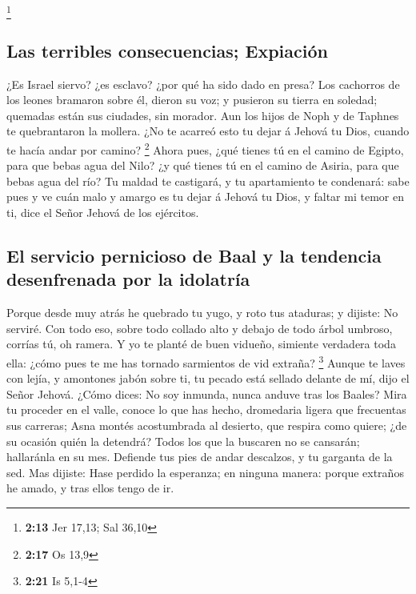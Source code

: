 \footnote{\textbf{2:13} Jer 17,13; Sal 36,10}

\hypertarget{las-terribles-consecuencias-expiaciuxf3n}{%
\subsection{Las terribles consecuencias;
Expiación}\label{las-terribles-consecuencias-expiaciuxf3n}}

 ¿Es Israel siervo? ¿es esclavo? ¿por qué ha sido dado en
presa?  Los cachorros de los leones bramaron sobre él,
dieron su voz; y pusieron su tierra en soledad; quemadas están sus
ciudades, sin morador.  Aun los hijos de Noph y de
Taphnes te quebrantaron la mollera.  ¿No te acarreó esto
tu dejar á Jehová tu Dios, cuando te hacía andar por camino? \footnote{\textbf{2:17}
  Os 13,9}  Ahora pues, ¿qué tienes tú en el camino de
Egipto, para que bebas agua del Nilo? ¿y qué tienes tú en el camino de
Asiria, para que bebas agua del río?  Tu maldad te
castigará, y tu apartamiento te condenará: sabe pues y ve cuán malo y
amargo es tu dejar á Jehová tu Dios, y faltar mi temor en ti, dice el
Señor Jehová de los ejércitos.

\hypertarget{el-servicio-pernicioso-de-baal-y-la-tendencia-desenfrenada-por-la-idolatruxeda}{%
\subsection{El servicio pernicioso de Baal y la tendencia desenfrenada
por la
idolatría}\label{el-servicio-pernicioso-de-baal-y-la-tendencia-desenfrenada-por-la-idolatruxeda}}

 Porque desde muy atrás he quebrado tu yugo, y roto tus
ataduras; y dijiste: No serviré. Con todo eso, sobre todo collado alto y
debajo de todo árbol umbroso, corrías tú, oh ramera.  Y
yo te planté de buen vidueño, simiente verdadera toda ella: ¿cómo pues
te me has tornado sarmientos de vid extraña? \footnote{\textbf{2:21} Is
  5,1-4}  Aunque te laves con lejía, y amontones jabón
sobre ti, tu pecado está sellado delante de mí, dijo el Señor Jehová.
 ¿Cómo dices: No soy inmunda, nunca anduve tras los
Baales? Mira tu proceder en el valle, conoce lo que has hecho,
dromedaria ligera que frecuentas sus carreras;  Asna
montés acostumbrada al desierto, que respira como quiere; ¿de su ocasión
quién la detendrá? Todos los que la buscaren no se cansarán; hallaránla
en su mes.  Defiende tus pies de andar descalzos, y tu
garganta de la sed. Mas dijiste: Hase perdido la esperanza; en ninguna
manera: porque extraños he amado, y tras ellos tengo de ir.

